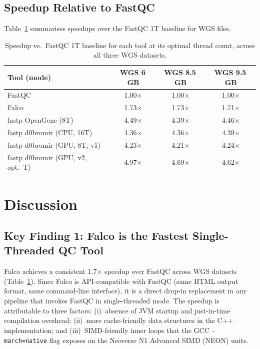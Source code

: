 \documentclass[a4paper,12pt]{article}
\begin{document}
\subsection{Speedup Relative to FastQC}

Table~\ref{tab:speedup} summarises speedups over the FastQC 1T baseline for
WGS files.

\begin{table}[H]
  \centering
  \caption{Speedup vs.\ FastQC 1T baseline for each tool at its optimal
    thread count, across all three WGS datasets.}
  \label{tab:speedup}
  \begin{tabular}{lccc}
    \toprule
    \textbf{Tool (mode)} & \textbf{WGS 6\,GB} & \textbf{WGS 8.5\,GB} & \textbf{WGS 9.5\,GB} \\
    \midrule
    FastQC             & 1.00$\times$ & 1.00$\times$ & 1.00$\times$ \\
    Falco              & 1.73$\times$ & 1.73$\times$ & 1.71$\times$ \\
    fastp OpenGene (8T) & 4.49$\times$ & 4.39$\times$ & 4.46$\times$ \\
    fastp d0bromir (CPU, 16T)         & 4.36$\times$ & 4.36$\times$ & 4.39$\times$ \\
    fastp d0bromir (GPU, 8T, v1)      & 4.23$\times$ & 4.21$\times$ & 4.24$\times$ \\
    fastp d0bromir (GPU, v2, opt.~T)  & 4.97$\times$ & 4.69$\times$ & 4.62$\times$ \\
    \bottomrule
  \end{tabular}
\end{table}

\section{Discussion}
\label{sec:discussion}

\subsection{Key Finding 1: Falco is the Fastest Single-Threaded QC Tool}

Falco achieves a consistent 1.7$\times$ speedup over FastQC across WGS
datasets (Table~\ref{tab:speedup}).  Since Falco is API-compatible with FastQC
(same HTML output format, same command-line interface), it is a direct
drop-in replacement in any pipeline that invokes FastQC in single-threaded mode.
The speedup is attributable to three factors: (i)~absence of JVM startup and
just-in-time compilation overhead; (ii)~more cache-friendly data structures in
the C++ implementation; and (iii)~SIMD-friendly inner loops that the GCC
\texttt{-march=native} flag exposes on the Neoverse N1 Advanced SIMD (NEON) units.
\end{document}
